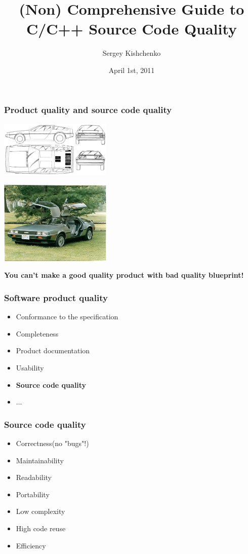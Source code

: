 \documentclass{beamer}
\title{(Non) Comprehensive Guide to C/C++ Source Code Quality}
\author{Sergey Kishchenko}
\date{April 1st, 2011}
\institute{Quickoffice}
\begin{document}
\frame{\titlepage}
\begin{frame} 
\frametitle{Product quality and source code quality}
\begin{multicols}{2}

\includegraphics[width=0.4\textwidth]{img/delorean-blueprint}
\columnbreak
{}

\includegraphics[width=0.4\textwidth]{img/delorean}
\end{multicols}
\begin{center}
\textbf{You can't make a good quality product with bad quality blueprint!}
\end{center}
\end{frame} 

\begin{frame}
\frametitle{Software product quality}
\begin{itemize}
\item Conformance to the specification
\item Completeness
\item Product documentation
\item Usability
\item \textbf{Source code quality}
\item ...
\end{itemize}
\end{frame}

\begin{frame}
\frametitle{Source code quality}
\begin{itemize}
\item Correctness(no "bugs"!)
\item Maintainability
\item Readability
\item Portability
\item Low complexity
\item High code reuse
\item Efficiency
\end{itemize}
\end{frame}
\end{document}

